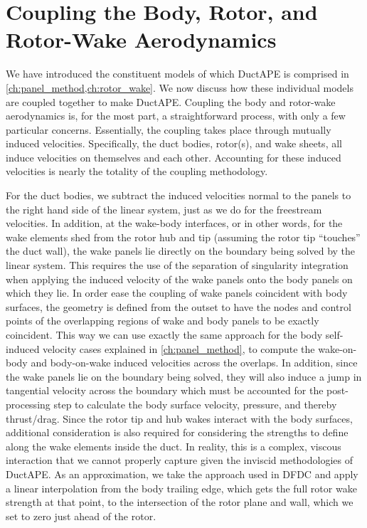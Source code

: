 

\section{Coupling the Body, Rotor, and Rotor-Wake Aerodynamics}

We have introduced the constituent models of which DuctAPE is comprised in \cref{ch:panel_method,ch:rotor_wake}.
%
We now discuss how these individual models are coupled together to make DuctAPE.
%
Coupling the body and rotor-wake aerodynamics is, for the most part, a straightforward process, with only a few particular concerns.
%
Essentially, the coupling takes place through mutually induced velocities.
%
Specifically, the duct bodies, rotor(s), and wake sheets, all induce velocities on themselves and each other.
%
Accounting for these induced velocities is nearly the totality of the coupling methodology.


For the duct bodies, we subtract the induced velocities normal to the panels to the right hand side of the linear system, just as we do for the freestream velocities.
%
In addition, at the wake-body interfaces, or in other words, for the wake elements shed from the rotor hub and tip (assuming the rotor tip ``touches'' the duct wall), the wake panels lie directly on the boundary being solved by the linear system.
%
This requires the use of the separation of singularity integration when applying the induced velocity of the wake panels onto the body panels on which they lie.
%
In order ease the coupling of wake panels coincident with body surfaces, the geometry is defined from the outset to have the nodes and control points of the overlapping regions of wake and body panels to be exactly coincident.
%
This way we can use exactly the same approach for the body self-induced velocity cases explained in \cref{ch:panel_method}, to compute the wake-on-body and body-on-wake induced velocities across the overlaps.
%
In addition, since the wake panels lie on the boundary being solved, they will also induce a jump in tangential velocity across the boundary which must be accounted for the post-processing step to calculate the body surface velocity, pressure, and thereby thrust/drag.
%
Since the rotor tip and hub wakes interact with the body surfaces, additional consideration is also required for considering the strengths to define along the wake elements inside the duct.
%
In reality, this is a complex, viscous interaction that we cannot properly capture given the inviscid methodologies of DuctAPE.
%
As an approximation, we take the approach used in DFDC and apply a linear interpolation from the body trailing edge, which gets the full rotor wake strength at that point, to the intersection of the rotor plane and wall, which we set to zero just ahead of the rotor.
%

